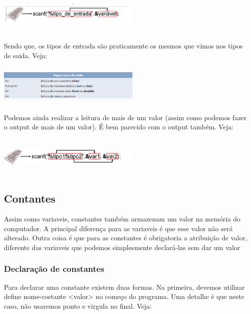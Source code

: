 \documentclass{report}
\begin{document}
	\begin{center}
		
		\includegraphics[width=7cm,height=2cm,keepaspectratio=false]{imagens/inputar.png}
	\end{center}
	
	Sendo que, os tipos de entrada são praticamente os mesmos que vimos nos tipos de saida. Veja:
	
	\begin{center}
		
		\includegraphics[width=7cm,height=2cm,keepaspectratio=false]{imagens/tipos_entrada.png}
	\end{center}
	
	Podemos ainda realizar a leitura de mais de um valor (assim como podemos fazer o output de mais de um valor). É bem parecido com o output também. Veja:
	
	
	\begin{center}
		
		\includegraphics[width=7cm,height=2cm,keepaspectratio=false]{imagens/inputar_varios.png}
	\end{center}
	
	
	\subsection{Contantes}
	Assim como variaveis, constantes também armazenam um valor na memória do computador. A principal diferença para as variaveis é que esse valor não será alterado. Outra coisa é que para as constantes é obrigatoria a atribuição de valor, diferente das variaveis que podemos simplesmente declará-las sem dar um valor
	\subsubsection{Declaração de constantes}
	Para declarar uma constante existem duas formas. Na primeira, devemos  utilizar define nome-costante <valor> no começo do programa. Uma detalhe é que neste caso, não usaremos ponto e virgula no final. Veja:
	
\end{document}
